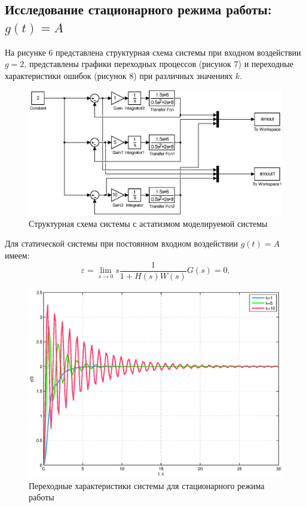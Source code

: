 \documentclass[12pt,a4paper]{article}
\begin{document}
\subsection{Исследование стационарного режима работы: $g(t)=A$} 
На рисунке 6 представлена структурная схема системы при входном воздействии \\$g=2$, представлены графики переходных процессов (рисунок 7) и переходные характеристики ошибок (рисунок 8) при различных значениях $k$. 
\begin{figure}[H]
	\centering
	\includegraphics[width=1\linewidth]{scheme/scheme3.eps}
	\caption{Структурная схема системы с астатизмом моделируемой системы}
\end{figure}
Для статической системы при постоянном входном воздействии $g(t)=A$ имеем:
\begin{equation}
    \varepsilon = \lim_{s\to0} s\frac{1}{1+H(s)W(s)}G(s) = 0.
\end{equation}
\begin{figure}[H]
	\centering
	\includegraphics[width=0.8\linewidth]{scheme/plot5.eps}
	\caption{Переходные характеристики системы для стационарного режима работы}
\end{figure}
\end{document}
